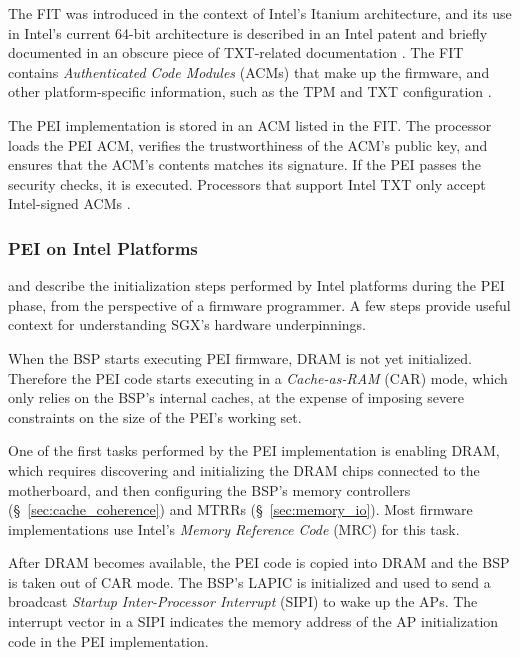 The FIT \cite{qureshi2006fit} was introduced in the context of Intel's Itanium
architecture, and its use in Intel's current 64-bit architecture is described
in an Intel patent \cite{datta2013acm} and briefly documented in an obscure
piece of TXT-related documentation \cite{intel2010txtlab}. The FIT contains
\textit{Authenticated Code Modules} (ACMs) that make up the firmware, and
other platform-specific information, such as the TPM and TXT configuration
\cite{intel2010txtlab}.

The PEI implementation is stored in an ACM listed in the FIT. The processor
loads the PEI ACM, verifies the trustworthiness of the ACM's public key, and
ensures that the ACM's contents matches its signature. If the PEI passes the
security checks, it is executed. Processors that support Intel TXT only accept
Intel-signed ACMs \cite[p. 92]{futral2013servertxt}.


\subsubsection{PEI on Intel Platforms}
\label{sec:uefi_pei_details}

\cite{intel2010booting} and \cite{coreboot2015manual} describe the
initialization steps performed by Intel platforms during the PEI phase, from
the perspective of a firmware programmer. A few steps provide useful context
for understanding SGX's hardware underpinnings.


When the BSP starts executing PEI firmware, DRAM is not yet initialized.
Therefore the PEI code starts executing in a \textit{Cache-as-RAM} (CAR) mode,
which only relies on the BSP's internal caches, at the expense of imposing
severe constraints on the size of the PEI's working set.

One of the first tasks performed by the PEI implementation is enabling DRAM,
which requires discovering and initializing the DRAM chips connected to the
motherboard, and then configuring the BSP's memory controllers
(\S~\ref{sec:cache_coherence}) and MTRRs (\S~\ref{sec:memory_io}). Most
firmware implementations use Intel's \textit{Memory Reference Code} (MRC) for
this task.

After DRAM becomes available, the PEI code is copied into DRAM and the BSP is
taken out of CAR mode. The BSP's LAPIC is initialized and used to send a
broadcast \textit{Startup Inter-Processor Interrupt} (SIPI) to wake up the
APs. The interrupt vector in a SIPI indicates the memory address of the AP
initialization code in the PEI implementation.

